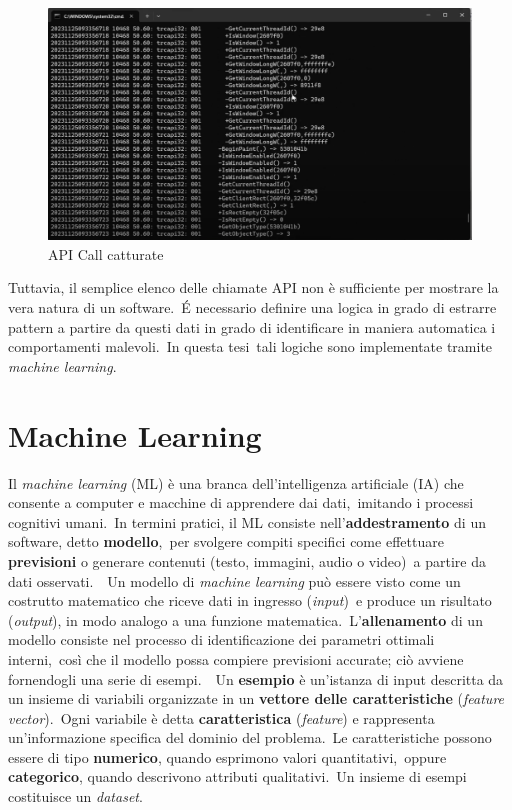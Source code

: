 \begin{figure}[htbp]
      \centering
      \includegraphics[width=1\textwidth]{./stato-dell-arte/imgs/api_call_example.png}
      \caption{API Call catturate}
      \label{fig:api_call_example}
\end{figure}

Tuttavia, il semplice elenco delle chiamate API non è sufficiente per mostrare la vera natura di un software.\
É necessario definire una logica in grado di estrarre pattern a partire da questi dati in grado di identificare in maniera automatica i comportamenti malevoli.\
In questa tesi\ tali logiche sono implementate tramite \textit{machine learning}.

\section{Machine Learning}

Il \textit{machine learning} (ML) è una branca dell'intelligenza artificiale (IA) che consente a computer e macchine di apprendere dai dati,\
imitando i processi cognitivi umani.\
In termini pratici, il ML consiste nell'\textbf{addestramento} di un software, detto \textbf{modello},\
per svolgere compiti specifici come effettuare \textbf{previsioni} o generare contenuti (testo, immagini, audio o video)\
a partire da dati osservati.\
\
Un modello di \textit{machine learning} può essere visto come un costrutto matematico che riceve dati in ingresso (\textit{input})\
e produce un risultato (\textit{output}), in modo analogo a una funzione matematica.\
L'\textbf{allenamento} di un modello consiste nel processo di identificazione dei parametri ottimali interni,\
così che il modello possa compiere previsioni accurate; ciò avviene fornendogli una serie di esempi.\
\
Un \textbf{esempio} è un'istanza di input descritta da un insieme di variabili organizzate in un \textbf{vettore delle caratteristiche}
(\textit{feature vector}).\
Ogni variabile è detta \textbf{caratteristica} (\textit{feature}) e rappresenta un'informazione specifica del dominio del problema.\
Le caratteristiche possono essere di tipo \textbf{numerico}, quando esprimono valori quantitativi,\
oppure \textbf{categorico}, quando descrivono attributi qualitativi.\
Un insieme di esempi costituisce un \textit{dataset}.


